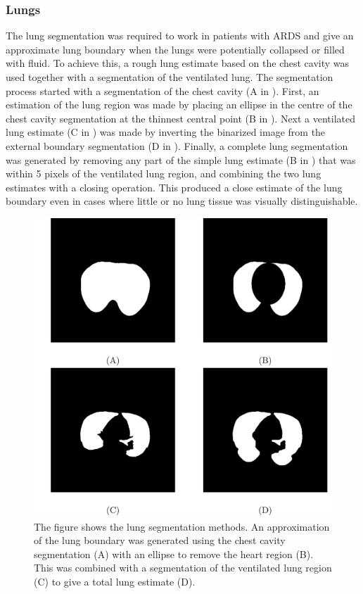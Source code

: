 \subsubsection{Lungs}
The lung segmentation was required to work in patients with ARDS and give 
an approximate lung boundary when the lungs were potentially collapsed or filled with 
fluid. To achieve this, a rough lung estimate based on the chest cavity  
was used together with a segmentation of the 
ventilated lung.
The segmentation process started with a segmentation of the chest cavity (A in ).
First, an estimation of the lung region was made by placing an ellipse
in the centre of the chest cavity segmentation at the thinnest central
point (B in ). Next a ventilated lung estimate 
(C in )
was made
by inverting the binarized image from the external boundary segmentation
(D in ). 
Finally, a complete lung segmentation was generated by removing any part of the
simple lung estimate (B in ) that was within 5 
pixels of the ventilated lung region, and combining the two 
lung estimates with a closing operation. 
This produced a close estimate of the lung boundary even in cases where
little or no lung tissue was visually distinguishable. 

\begin{figure}[H]
	\centering
	\includegraphics[width=\textwidth]{chapter5-CT_to_mesh/imgs/lung_seg_methods.pdf}
	\caption[Lung segmentation methods.]{\label{fig:lung_seg_methods}%
	The figure shows the lung segmentation methods.
	An approximation of the lung boundary was generated using the chest cavity segmentation
	(A) with an ellipse to remove the heart region (B).
	This was combined with a segmentation of the ventilated lung region (C) 
	to give a total lung estimate (D).
	}
\end{figure}

